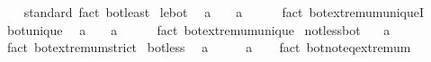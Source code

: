 \begin{isabellebody}
%
\isadelimproof
\ \ %
\endisadelimproof
%
\isatagproof
{}\isamarkupfalse%
\ standard\ {\isacharparenleft}{\kern0pt}fact\ bot{\isacharunderscore}{\kern0pt}least{\isacharparenright}{\kern0pt}%
\endisatagproof
{\isafoldproof}%
%
\isadelimproof
\isanewline
%
\endisadelimproof
\isanewline
{}\isamarkupfalse%
\ le{\isacharunderscore}{\kern0pt}bot{\isacharcolon}{\kern0pt}\isanewline
\ \ {\isachardoublequoteopen}a\ {\isasymle}\ {\isasymbottom}\ {\isasymLongrightarrow}\ a\ {\isacharequal}{\kern0pt}\ {\isasymbottom}{\isachardoublequoteclose}\isanewline
%
\isadelimproof
\ \ %
\endisadelimproof
%
\isatagproof
{}\isamarkupfalse%
\ {\isacharparenleft}{\kern0pt}fact\ bot{\isachardot}{\kern0pt}extremum{\isacharunderscore}{\kern0pt}uniqueI{\isacharparenright}{\kern0pt}%
\endisatagproof
{\isafoldproof}%
%
\isadelimproof
\isanewline
%
\endisadelimproof
\isanewline
{}\isamarkupfalse%
\ bot{\isacharunderscore}{\kern0pt}unique{\isacharcolon}{\kern0pt}\isanewline
\ \ {\isachardoublequoteopen}a\ {\isasymle}\ {\isasymbottom}\ {\isasymlongleftrightarrow}\ a\ {\isacharequal}{\kern0pt}\ {\isasymbottom}{\isachardoublequoteclose}\isanewline
%
\isadelimproof
\ \ %
\endisadelimproof
%
\isatagproof
{}\isamarkupfalse%
\ {\isacharparenleft}{\kern0pt}fact\ bot{\isachardot}{\kern0pt}extremum{\isacharunderscore}{\kern0pt}unique{\isacharparenright}{\kern0pt}%
\endisatagproof
{\isafoldproof}%
%
\isadelimproof
\isanewline
%
\endisadelimproof
\isanewline
{}\isamarkupfalse%
\ not{\isacharunderscore}{\kern0pt}less{\isacharunderscore}{\kern0pt}bot{\isacharcolon}{\kern0pt}\isanewline
\ \ {\isachardoublequoteopen}{\isasymnot}\ a\ {\isacharless}{\kern0pt}\ {\isasymbottom}{\isachardoublequoteclose}\isanewline
%
\isadelimproof
\ \ %
\endisadelimproof
%
\isatagproof
{}\isamarkupfalse%
\ {\isacharparenleft}{\kern0pt}fact\ bot{\isachardot}{\kern0pt}extremum{\isacharunderscore}{\kern0pt}strict{\isacharparenright}{\kern0pt}%
\endisatagproof
{\isafoldproof}%
%
\isadelimproof
\isanewline
%
\endisadelimproof
\isanewline
{}\isamarkupfalse%
\ bot{\isacharunderscore}{\kern0pt}less{\isacharcolon}{\kern0pt}\isanewline
\ \ {\isachardoublequoteopen}a\ {\isasymnoteq}\ {\isasymbottom}\ {\isasymlongleftrightarrow}\ {\isasymbottom}\ {\isacharless}{\kern0pt}\ a{\isachardoublequoteclose}\isanewline
%
\isadelimproof
\ \ %
\endisadelimproof
%
\isatagproof
{}\isamarkupfalse%
\ {\isacharparenleft}{\kern0pt}fact\ bot{\isachardot}{\kern0pt}not{\isacharunderscore}{\kern0pt}eq{\isacharunderscore}{\kern0pt}extremum{\isacharparenright}{\kern0pt}%

\end{isabellebody}

